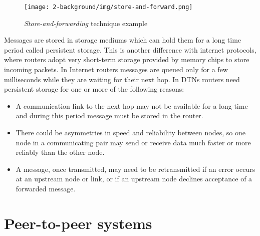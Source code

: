 \begin{figure}[htpb]
  \begin{center}
    \texttt{[image: 2-background/img/store-and-forward.png]}
    \caption{\textit{Store-and-forwarding} technique example}    
    \label{fig:store-carry-forward}
  \end{center}
\end{figure}

Messages are stored in storage mediums which can hold them for a long time period called persistent storage. This is another difference with internet protocols, where routers adopt very short-term storage provided by memory chips to store incoming packets. In Internet routers messages are queued only for a few milliseconds while they are waiting for their next hop. In DTNs routers need persistent storage for one or more of the following reasons:
\begin{itemize}
\item A communication link to the next hop may not be available for a long time and during this period message must be stored in the router.
\item There could be asymmetries in speed and reliability between nodes, so one node in a communicating pair may send or receive data much faster or more reliably than the other node.
\item A message, once transmitted, may need to be retransmitted if an error occurs at an upstream node or link, or if an upstream node declines acceptance of a forwarded message.
\end{itemize}



 
\section{Peer-to-peer systems}




